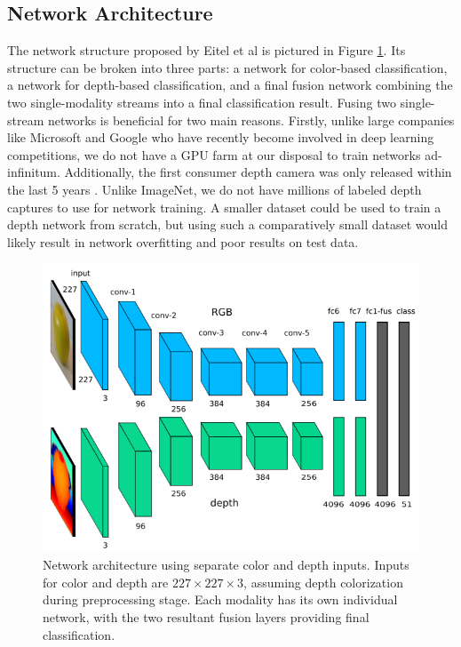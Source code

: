 \subsection{Network Architecture}
The network structure proposed by Eitel et al \cite{Eitel2015} is pictured in Figure \ref{fig:network}. Its structure can be broken into three parts: a network for color-based classification, a network for depth-based classification, and a final fusion network combining the two single-modality streams into a final classification result. Fusing two single-stream networks is beneficial for two main reasons. Firstly, unlike large companies like Microsoft and Google who have recently become involved in deep learning competitions, we do not have a GPU farm at our disposal to train networks ad-infinitum. Additionally, the first consumer depth camera was only released within the last 5 years \cite{Alex2009_kinect}. Unlike ImageNet, we do not have millions of labeled depth captures to use for network training. A smaller dataset could be used to train a depth network from scratch, but using such a comparatively small dataset would likely result in network overfitting and poor results on test data.

\begin{figure}[htbp]
	\centering
	\includegraphics[width=0.85\linewidth]{img/architecture.png} 
	\caption{Network architecture using separate color and depth inputs. Inputs for color and depth are $227 \times 227 \times 3$, assuming depth colorization during preprocessing stage. Each modality has its own individual network, with the two resultant fusion layers providing final classification.}
	\label{fig:network}
\end{figure}

